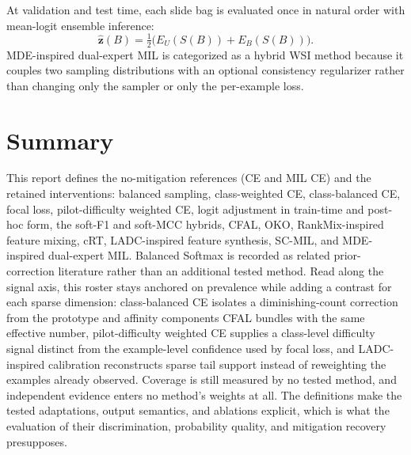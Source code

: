 \documentclass[11pt]{article}
\begin{document}
At validation and test time, each slide bag is evaluated once in natural order with mean-logit ensemble inference:
\begin{equation}
  \hat{\mathbf{z}}(B) = \tfrac{1}{2}\bigl(E_U(S(B)) + E_B(S(B))\bigr).
  \label{eq:mde-ensemble}
\end{equation}
\noindent MDE-inspired dual-expert MIL is categorized as a hybrid WSI method because it couples two sampling distributions with an optional consistency regularizer rather than changing only the sampler or only the per-example loss.

\section{Summary}
\label{sec:summary}
This report defines the no-mitigation references (CE and MIL CE) and the retained interventions: balanced sampling, class-weighted CE, class-balanced CE, focal loss, pilot-difficulty weighted CE, logit adjustment in train-time and post-hoc form, the soft-F1 and soft-MCC hybrids, CFAL, OKO, RankMix-inspired feature mixing, cRT, LADC-inspired feature synthesis, SC-MIL, and MDE-inspired dual-expert MIL. Balanced Softmax is recorded as related prior-correction literature rather than an additional tested method. Read along the signal axis, this roster stays anchored on prevalence while adding a contrast for each sparse dimension: class-balanced CE isolates a diminishing-count correction from the prototype and affinity components CFAL bundles with the same effective number, pilot-difficulty weighted CE supplies a class-level difficulty signal distinct from the example-level confidence used by focal loss, and LADC-inspired calibration reconstructs sparse tail support instead of reweighting the examples already observed. Coverage is still measured by no tested method, and independent evidence enters no method's weights at all. The definitions make the tested adaptations, output semantics, and ablations explicit, which is what the evaluation of their discrimination, probability quality, and mitigation recovery presupposes.

\clearpage


\end{document}
